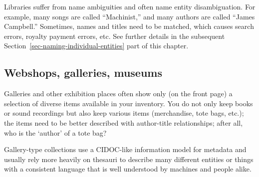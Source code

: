 \documentclass[
  letterpaper,
  DIV=11,
  numbers=noendperiod]{scrreprt}
\begin{document}
Libraries suffer from name ambiguities and often name entity
disambiguation. For example, many songs are called ``Machinist,'' and
many authors are called ``James Campbell.'' Sometimes, names and titles
need to be matched, which causes search errors, royalty payment errors,
etc. See further details in the subsequent
Section~\ref{sec-naming-individual-entities} part of this chapter.

\subsection{Webshops, galleries,
museums}\label{webshops-galleries-museums}

Galleries and other exhibition places often show only (on the front
page) a selection of diverse items available in your inventory. You do
not only keep books or sound recordings but also keep various items
(merchandise, tote bags, etc.); the items need to be better described
with author-title relationships; after all, who is the `author' of a
tote bag?

Gallery-type collections use a CIDOC-like information model for metadata
and usually rely more heavily on thesauri to describe many different
entities or things with a consistent language that is well understood by
machines and people alike.
\end{document}
